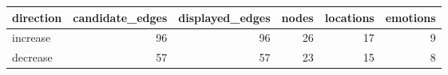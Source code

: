 \begin{tabular}{lrrrrr}
\toprule
direction & candidate\_edges & displayed\_edges & nodes & locations & emotions \\
\midrule
increase & 96 & 96 & 26 & 17 & 9 \\
decrease & 57 & 57 & 23 & 15 & 8 \\
\bottomrule
\end{tabular}
